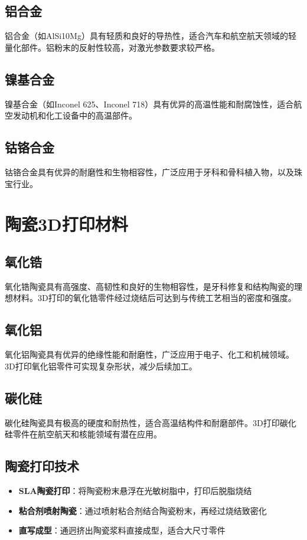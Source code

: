 \documentclass[12pt,UTF8]{ctexbook}
\begin{document}
\subsection{铝合金}
铝合金（如AlSi10Mg）具有轻质和良好的导热性，适合汽车和航空航天领域的轻量化部件。铝粉末的反射性较高，对激光参数要求较严格。

\subsection{镍基合金}
镍基合金（如Inconel 625、Inconel 718）具有优异的高温性能和耐腐蚀性，适合航空发动机和化工设备中的高温部件。

\subsection{钴铬合金}
钴铬合金具有优异的耐磨性和生物相容性，广泛应用于牙科和骨科植入物，以及珠宝行业。

\section{陶瓷3D打印材料}

\subsection{氧化锆}
氧化锆陶瓷具有高强度、高韧性和良好的生物相容性，是牙科修复和结构陶瓷的理想材料。3D打印的氧化锆零件经过烧结后可达到与传统工艺相当的密度和强度。

\subsection{氧化铝}
氧化铝陶瓷具有优异的绝缘性能和耐磨性，广泛应用于电子、化工和机械领域。3D打印氧化铝零件可实现复杂形状，减少后续加工。

\subsection{碳化硅}
碳化硅陶瓷具有极高的硬度和耐热性，适合高温结构件和耐磨部件。3D打印碳化硅零件在航空航天和核能领域有潜在应用。

\subsection{陶瓷打印技术}
\begin{itemize}
\item \textbf{SLA陶瓷打印}：将陶瓷粉末悬浮在光敏树脂中，打印后脱脂烧结
\item \textbf{粘合剂喷射陶瓷}：通过喷射粘合剂结合陶瓷粉末，再经过烧结致密化
\item \textbf{直写成型}：通迥挤出陶瓷浆料直接成型，适合大尺寸零件
\end{itemize}
\end{document}
